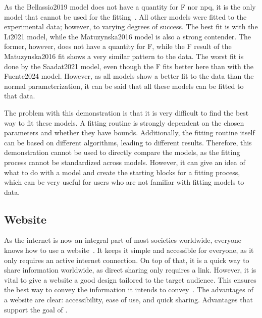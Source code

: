 As the Bellassio2019 model does not have a quantity for \gls{F} nor \gls{npq}, it is the only model that cannot be used for the fitting~. All other models were fitted to the experimental data; however, to varying degrees of success. The best fit is with the Li2021 model, while the Matuzynska2016 model is also a strong contender. The former, however, does not have a quantity for \gls{F}, while the \gls{F} result of the Matuzynska2016 fit shows a very similar pattern to the data. The worst fit is done by the Saadat2021 model, even though the \gls{F} fits better here than with the Fuente2024 model. However, as all models show a better fit to the data than the normal parameterization, it can be said that all these models can be fitted to that data.

The problem with this demonstration is that it is very difficult to find the best way to fit these models. A fitting routine is strongly dependent on the chosen parameters and whether they have bounds. Additionally, the fitting routine itself can be based on different algorithms, leading to different results. Therefore, this demonstration cannot be used to directly compare the models, as the fitting process cannot be standardized across models. However, it can give an idea of what to do with a model and create the starting blocks for a fitting process, which can be very useful for users who are not familiar with fitting models to data.

\subsection{Website}

As the internet is now an integral part of most societies worldwide, everyone knows how to use a website~\cite{MeasuringDigitalDevelopment}. It keeps it simple and accessible for everyone, as it only requires an active internet connection. On top of that, it is a quick way to share information worldwide, as direct sharing only requires a link. However, it is vital to give a website a good design tailored to the target audience. This ensures the best way to convey the information it intends to convey~\cite {DataReportalGlobalDigital}. The advantages of a website are clear: accessibility, ease of use, and quick sharing. Advantages that support the goal of \greensloth{}.


